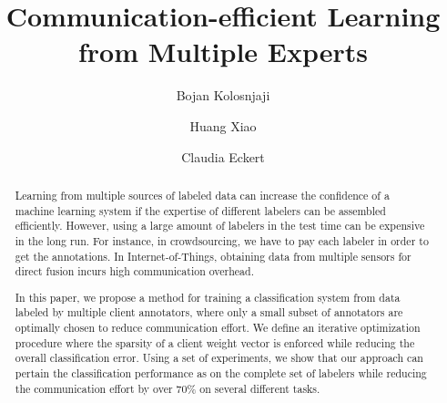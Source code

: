 \documentclass{llncs}
\begin{document}
%
\frontmatter          %
%
%
\mainmatter              %
%
\title{ Communication-efficient Learning from Multiple Experts}
%
%
\author{Bojan  Kolosnjaji \and Huang Xiao 
	\and Claudia Eckert }
%
%
%

\maketitle              %

\begin{abstract}
Learning from multiple sources of labeled data can increase the confidence of a machine learning system if the expertise of different labelers can be assembled efficiently. However, using a large amount of labelers in the test time can be expensive in the long run. For instance, in crowdsourcing, we have to pay each labeler in order to get the annotations. In Internet-of-Things, obtaining data from multiple sensors for
direct fusion incurs high communication overhead. 

In this paper, we propose a method for training a classification system from data labeled by multiple client annotators, where only a small subset of annotators are optimally chosen to reduce communication effort. 
We define an iterative optimization procedure where the sparsity of a client weight vector is enforced while reducing the overall classification error. Using a set of experiments, we show that our approach can pertain the classification performance as on the complete set of labelers while reducing the communication effort by over 70\% on several different tasks.


\end{abstract}
%
\end{document}

